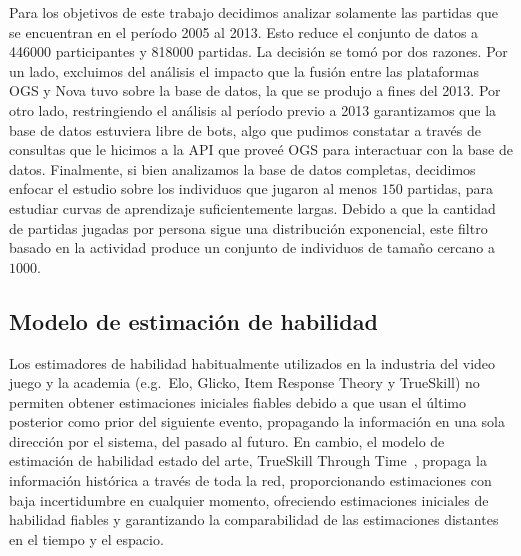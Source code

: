 \documentclass[a4paper,11pt]{book}
\theoremstyle{definition}
\begin{document}
Para los objetivos de este trabajo decidimos analizar solamente las partidas que se encuentran en el per\'iodo 2005 al 2013.
%
Esto reduce el conjunto de datos a \num{446000} participantes y \num{818000} partidas.
%
La decisi\'on se tom\'o por dos razones.
%
Por un lado, excluimos del an\'alisis el impacto que la fusi\'on entre las plataformas OGS y Nova tuvo sobre la base de datos, la que se produjo a fines del 2013.
%
Por otro lado, restringiendo el an\'alisis al per\'iodo previo a 2013 garantizamos que la base de datos estuviera libre de bots, algo que pudimos constatar a trav\'es de consultas que le hicimos a la API que prove\'e OGS para interactuar con la base de datos.
%
Finalmente, si bien analizamos la base de datos completas, decidimos enfocar el estudio sobre los individuos que jugaron al menos $150$ partidas, para estudiar curvas de aprendizaje suficientemente largas.
%
Debido a que la cantidad de partidas jugadas por persona sigue una distribuci\'on exponencial, este filtro basado en la actividad produce un conjunto de individuos de tama\~no cercano a $1000$.


\subsection{Modelo de estimaci\'on de habilidad}

Los estimadores de habilidad habitualmente utilizados en la industria del video juego y la academia (e.g.~Elo, Glicko, Item Response Theory y TrueSkill) no permiten obtener estimaciones iniciales fiables debido a que usan el \'ultimo posterior como prior del siguiente evento, propagando la informaci\'on en una sola direcci\'on por el sistema, del pasado al futuro.
%
En cambio, el modelo de estimaci\'on de habilidad estado del arte, TrueSkill Through Time~\cite{Landfried2021-TTT, Dangauthier2007}, propaga la informaci\'on hist\'orica a trav\'es de toda la red, proporcionando estimaciones con baja incertidumbre en cualquier momento, ofreciendo estimaciones iniciales de habilidad fiables y garantizando la comparabilidad de las estimaciones distantes en el tiempo y el espacio.

\end{document}
